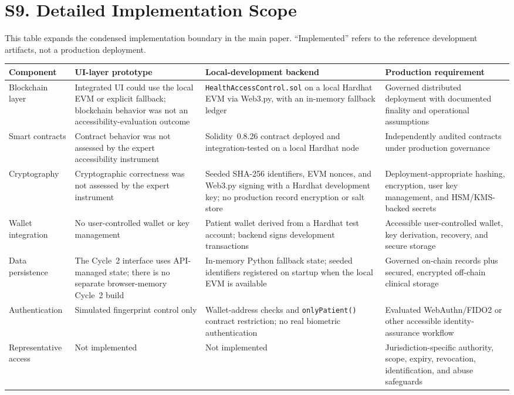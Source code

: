 \documentclass[10pt]{article}
\newcommand{\suppsection}[2]{\pdfbookmark[1]{#1}{#2}\section*{#1}}
\begin{document}
\suppsection{S9. Detailed Implementation Scope}{supp-s9}
This table expands the condensed implementation boundary in the main paper. ``Implemented'' refers to the reference development artifacts, not a production deployment.
\begin{center}\footnotesize
\begin{longtable}{|p{2.5cm}|p{4.0cm}|p{4.2cm}|p{4.2cm}|}
\hline
\textbf{Component} & \textbf{UI-layer prototype} & \textbf{Local-development backend} & \textbf{Production requirement}\\\hline\endhead
Blockchain layer & Integrated UI could use the local EVM or explicit fallback; blockchain behavior was not an accessibility-evaluation outcome & \texttt{HealthAccessControl.sol} on a local Hardhat EVM via Web3.py, with an in-memory fallback ledger & Governed distributed deployment with documented finality and operational assumptions\\\hline
Smart contracts & Contract behavior was not assessed by the expert accessibility instrument & Solidity~0.8.26 contract deployed and integration-tested on a local Hardhat node & Independently audited contracts under production governance\\\hline
Cryptography & Cryptographic correctness was not assessed by the expert instrument & Seeded SHA-256 identifiers, EVM nonces, and Web3.py signing with a Hardhat development key; no production record encryption or salt store & Deployment-appropriate hashing, encryption, user key management, and HSM/KMS-backed secrets\\\hline
Wallet integration & No user-controlled wallet or key management & Patient wallet derived from a Hardhat test account; backend signs development transactions & Accessible user-controlled wallet, key derivation, recovery, and secure storage\\\hline
Data persistence & The Cycle~2 interface uses API-managed state; there is no separate browser-memory Cycle~2 build & In-memory Python fallback state; seeded identifiers registered on startup when the local EVM is available & Governed on-chain records plus secured, encrypted off-chain clinical storage\\\hline
Authentication & Simulated fingerprint control only & Wallet-address checks and \texttt{onlyPatient()} contract restriction; no real biometric authentication & Evaluated WebAuthn/FIDO2 or other accessible identity-assurance workflow\\\hline
Representative access & Not implemented & Not implemented & Jurisdiction-specific authority, scope, expiry, revocation, identification, and abuse safeguards\\\hline

\end{longtable}
\end{center}
\end{document}
